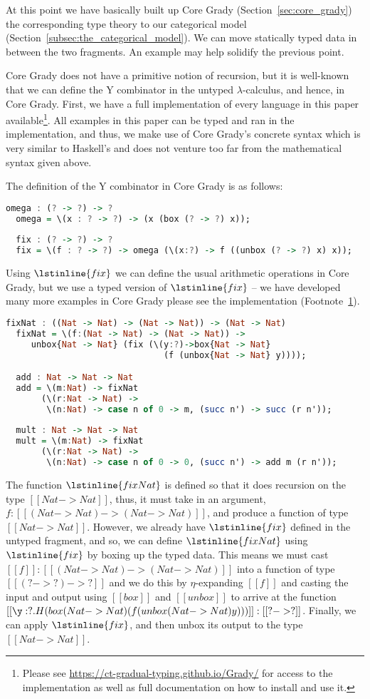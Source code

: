 At this point we have basically built up Core Grady
(Section~\ref{sec:core_grady}) the corresponding type theory to our
categorical model (Section~\ref{subsec:the_categorical_model}).  We
can move statically typed data in between the two fragments. An example
may help solidify the previous point.

Core Grady does not have a primitive notion of recursion, but it is
well-known that we can define the Y combinator in the untyped
$\lambda$-calculus, and hence, in Core Grady. First, we have a full
implementation of every language in this paper
available\footnote{\label{fn:impl} Please see
  \url{https://ct-gradual-typing.github.io/Grady/} for access to the
  implementation as well as full documentation on how to install and
  use it.}. All examples in this paper can be typed and ran in the
implementation, and thus, we make use of Core Grady's concrete syntax
which is very similar to Haskell's and does not venture too far from
the mathematical syntax given above.

The definition of the Y combinator in Core Grady is as follows:
\begin{lstlisting}[language=Haskell]
  omega : (? -> ?) -> ?
  omega = \(x : ? -> ?) -> (x (box (? -> ?) x));
  
  fix : (? -> ?) -> ?
  fix = \(f : ? -> ?) -> omega (\(x:?) -> f ((unbox (? -> ?) x) x));
\end{lstlisting}
Using $\lstinline{fix}$ we can define the usual arithmetic operations
in Core Grady, but we use a typed version of $\lstinline{fix}$ -- we
have developed many more examples in Core Grady please see the
implementation (Footnote~\ref{fn:impl}).
\begin{lstlisting}[language=Haskell]
  fixNat : ((Nat -> Nat) -> (Nat -> Nat)) -> (Nat -> Nat)
  fixNat = \(f:(Nat -> Nat) -> (Nat -> Nat)) ->
     unbox{Nat -> Nat} (fix (\(y:?)->box{Nat -> Nat} 
                               (f (unbox{Nat -> Nat} y))));

  add : Nat -> Nat -> Nat
  add = \(m:Nat) -> fixNat
       (\(r:Nat -> Nat) ->
        \(n:Nat) -> case n of 0 -> m, (succ n') -> succ (r n'));
        
  mult : Nat -> Nat -> Nat
  mult = \(m:Nat) -> fixNat
       (\(r:Nat -> Nat) ->
        \(n:Nat) -> case n of 0 -> 0, (succ n') -> add m (r n'));
\end{lstlisting}
The function $\lstinline{fixNat}$ is defined so that it does recursion
on the type $[[Nat -> Nat]]$, thus, it must take in an argument,
$f : [[(Nat -> Nat) -> (Nat -> Nat)]]$, and
produce a function of type $[[Nat -> Nat]]$.  However, we
already have $\lstinline{fix}$ defined in the untyped fragment, and
so, we can define $\lstinline{fixNat}$ using $\lstinline{fix}$ by
boxing up the typed data.  This means we must cast $[[f]] : [[(Nat -> Nat) -> (Nat -> Nat)]]$ into a function of type
$[[(? -> ?) -> ?]]$ and we do this by $\eta$-expanding
$[[f]]$ and casting the input and output using $[[box]]$ and
$[[unbox]]$ to arrive at the function
$[[\y:?.H(box (Nat -> Nat) (f (unbox (Nat -> Nat) y)))]] : [[? -> ?]]$.  Finally, we can apply $\lstinline{fix}$, and then unbox its output to the type $[[Nat -> Nat]]$.

